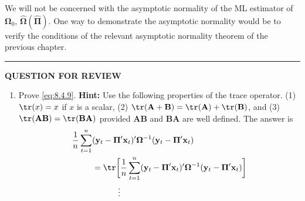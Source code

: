 We will not be concerned with the asymptotic normality of the ML estimator
of $\boldsymbol{\Omega}_0$, $\hat{\boldsymbol{\Omega}}(\hat{\boldsymbol{\Pi}})$. One way to demonstrate the asymptotic normality would be to verify
the conditions of the relevant asymptotic normality theorem of the previous chapter.

\bigskip
\noindent\rule{\textwidth}{0.4pt}
\textbf{QUESTION FOR REVIEW}
\medskip

\begin{enumerate}
\item Prove \eqref{eq:8.4.9}. \textbf{Hint:} Use the following properties of the trace operator.
  (1) $\tr(x) = x$ if $x$ is a scalar,
  (2) $\tr(\mathbf{A} + \mathbf{B}) = \tr(\mathbf{A}) + \tr(\mathbf{B})$, and
  (3) $\tr(\mathbf{A}\mathbf{B}) = \tr(\mathbf{B}\mathbf{A})$ provided $\mathbf{A}\mathbf{B}$ and $\mathbf{B}\mathbf{A}$
  are well defined. The answer is
  \begin{align*}
    \frac{1}{n}\sum_{t=1}^{n}
      &(\mathbf{y}_t - \boldsymbol{\Pi}'\mathbf{x}_t)'
      \boldsymbol{\Omega}^{-1}
      (\mathbf{y}_t - \boldsymbol{\Pi}'\mathbf{x}_t) \\
    &= \tr\biggl[\frac{1}{n}\sum_{t=1}^{n}
      (\mathbf{y}_t - \boldsymbol{\Pi}'\mathbf{x}_t)'
      \boldsymbol{\Omega}^{-1}
      (\mathbf{y}_t - \boldsymbol{\Pi}'\mathbf{x}_t)\biggr] \\
    &\phantom{= \tr\biggl[} \vdots
  \end{align*}
\end{enumerate}
